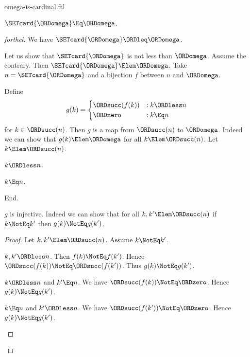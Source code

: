 \documentclass{stex}
\begin{document}
\begin{smodule}{omega-is-cardinal.ftl}

\begin{proposition}[forthel]
  $\SETcard{\ORDomega} \Eq \ORDomega$.
\end{proposition}
\begin{proof}[forthel]
  We have $\SETcard{\ORDomega} \ORDleq \ORDomega$.

  Let us show that $\SETcard{\ORDomega}$ is not less than $\ORDomega$.
    Assume the contrary.
    Then $\SETcard{\ORDomega} \Elem \ORDomega$.
    Take $n = \SETcard{\ORDomega}$ and a bijection $f$ between $n$ and $\ORDomega$.

    Define \[ g(k) =
      \begin{cases}
        \ORDsucc(f(k)) & : k \ORDless n
        \\
        \ORDzero           & : k \Eq n
      \end{cases} \]
    for $k \in \ORDsucc(n)$.
    Then $g$ is a map from $\ORDsucc(n)$ to $\ORDomega$.
    Indeed we can show that $g(k) \Elem \ORDomega$ for all $k \Elem \ORDsucc(n)$.
      Let $k \Elem \ORDsucc(n)$.
      \begin{case}{$k \ORDless n$.} \end{case}
      \begin{case}{$k \Eq n$.} \end{case}
    End.

    $g$ is injective.
    Indeed we can show that for all $k, k' \Elem \ORDsucc(n)$ if $k \NotEq k'$
    then $g(k) \NotEq g(k')$. 
    \begin{proof}
      Let $k, k' \Elem \ORDsucc(n)$.
      Assume $k \NotEq k'$.

      \begin{case}{$k, k' \ORDless n$.}
        Then $f(k) \NotEq f(k')$.
        Hence $\ORDsucc(f(k)) \NotEq \ORDsucc(f(k'))$.
        Thus $g(k) \NotEq g(k')$.
      \end{case}

      \begin{case}{$k \ORDless n$ and $k' \Eq n$.}
        We have $\ORDsucc(f(k)) \NotEq \ORDzero$.
        Hence $g(k) \NotEq g(k')$.
      \end{case}

      \begin{case}{$k \Eq n$ and $k' \ORDless n$.}
        We have $\ORDsucc(f(k')) \NotEq \ORDzero$.
        Hence $g(k) \NotEq g(k')$.
      \end{case}
    \end{proof}


\end{proof}
\end{smodule}
\end{document}
